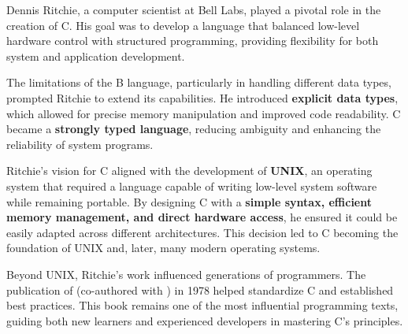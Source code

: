 \begin{NxSSSSBox}
	\begin{NxIDBox}
		Dennis Ritchie, a computer scientist at Bell Labs, played a pivotal role in the creation of C. His goal was to develop a language that balanced low-level hardware control with structured programming, providing flexibility for both system and application development.
	\end{NxIDBox}
	\begin{NxIDBox}
		The limitations of the B language, particularly in handling different data types, prompted Ritchie to extend its capabilities. He introduced \textbf{explicit data types}, which allowed for precise memory manipulation and improved code readability. C became a \textbf{strongly typed language}, reducing ambiguity and enhancing the reliability of system programs.
	\end{NxIDBox}
	\begin{NxIDBox}
		Ritchie's vision for C aligned with the development of \textbf{UNIX}, an operating system that required a language capable of writing low-level system software while remaining portable. By designing C with a \textbf{simple syntax, efficient memory management, and direct hardware access}, he ensured it could be easily adapted across different architectures. This decision led to C becoming the foundation of UNIX and, later, many modern operating systems.
	\end{NxIDBox}
	\begin{NxIDBox}
		Beyond UNIX, Ritchie's work influenced generations of programmers. The publication of  (co-authored with ) in 1978 helped standardize C and established best practices. This book remains one of the most influential programming texts, guiding both new learners and experienced developers in mastering C’s principles.
	\end{NxIDBox}
\end{NxSSSSBox}


